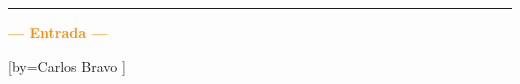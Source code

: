
\hrule \vspace{0.5cm}

\renewcommand{\songsectionletter}{B} %
\setcounter{songnum}{1}              %

\begin{intersong}
\vspace{0.3cm}
\hspace*{-0.7cm}\textbf{\huge\textcolor{darkorange}{--- Entrada ---}}
\vspace{0.3cm}
\end{intersong}

[by={Carlos Bravo} ]

